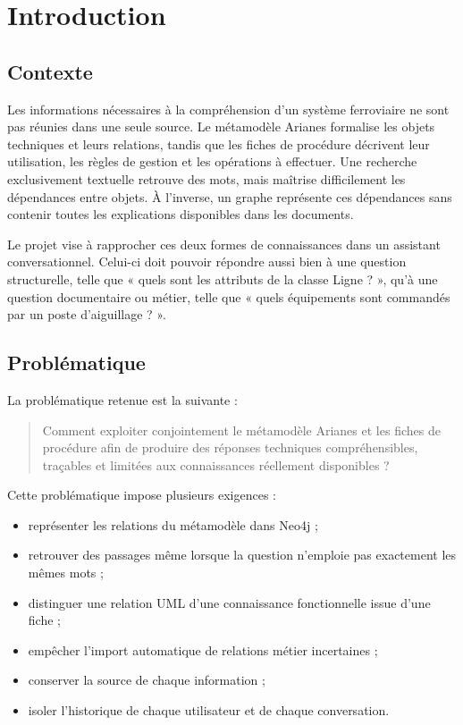 \chapter{Introduction}

\section{Contexte}

Les informations nécessaires à la compréhension d'un système ferroviaire ne sont pas réunies dans une seule source. Le métamodèle Arianes formalise les objets techniques et leurs relations, tandis que les fiches de procédure décrivent leur utilisation, les règles de gestion et les opérations à effectuer. Une recherche exclusivement textuelle retrouve des mots, mais maîtrise difficilement les dépendances entre objets. À l'inverse, un graphe représente ces dépendances sans contenir toutes les explications disponibles dans les documents.

Le projet vise à rapprocher ces deux formes de connaissances dans un assistant conversationnel. Celui-ci doit pouvoir répondre aussi bien à une question structurelle, telle que « quels sont les attributs de la classe Ligne ? », qu'à une question documentaire ou métier, telle que « quels équipements sont commandés par un poste d'aiguillage ? ».

\section{Problématique}

La problématique retenue est la suivante :

\begin{quote}
Comment exploiter conjointement le métamodèle Arianes et les fiches de procédure afin de produire des réponses techniques compréhensibles, traçables et limitées aux connaissances réellement disponibles ?
\end{quote}

Cette problématique impose plusieurs exigences :

\begin{itemize}
  \item représenter les relations du métamodèle dans Neo4j ;
  \item retrouver des passages même lorsque la question n'emploie pas exactement les mêmes mots ;
  \item distinguer une relation UML d'une connaissance fonctionnelle issue d'une fiche ;
  \item empêcher l'import automatique de relations métier incertaines ;
  \item conserver la source de chaque information ;
  \item isoler l'historique de chaque utilisateur et de chaque conversation.
\end{itemize}

